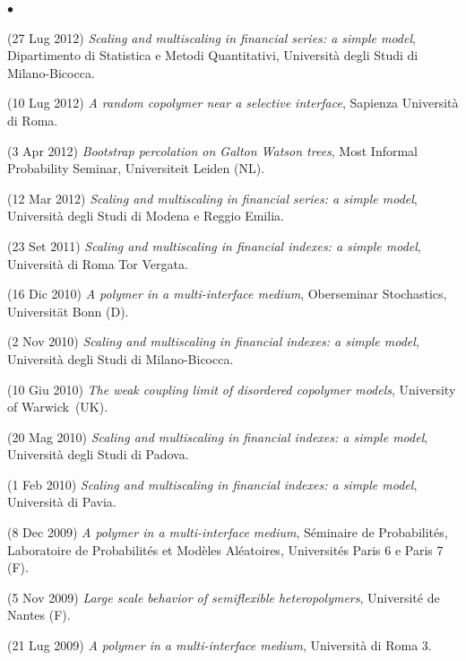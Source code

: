 \documentclass[a4paper,11pt,oneside]{amsart}
\newenvironment{myitemize}{%
\begin{list}{$\bullet$}%
 	{%
	\setlength{\itemsep}{0.3em}%
	\setlength{\topsep}{0.3em}%
	\setlength{\partopsep}{0em}%
	\setlength{\parsep}{0em}%
	\setlength{\parskip}{0em}%
	\setlength\leftmargin{1.5em}%
	\setlength\labelwidth{1.1em}%
	\setlength{\labelsep}{0.4em}%
	}%
	}%
{\end{list}}
\renewenvironment{itemize}{
\begin{myitemize}}%
{\end{myitemize}}
\begin{document}
\begin{itemize}
\item (27 Lug 2012)
\emph{Scaling and multiscaling in financial series: a simple model},
Dipartimento di Statistica e Metodi Quantitativi,
Università degli Studi di Milano-Bicocca.

\item (10 Lug 2012)
\emph{A random copolymer near a selective interface},
Sapienza Università di Roma.

\item (3 Apr 2012)
\emph{Bootstrap percolation on Galton Watson trees},
Most Informal Probability Seminar, Universiteit Leiden (NL).

\item (12 Mar 2012)
\emph{Scaling and multiscaling in financial series: a simple model},
Università degli Studi di Modena e Reggio Emilia.

\item (23 Set 2011)
\emph{Scaling and multiscaling in financial indexes: a simple model},
Università di Roma Tor Vergata.

\item (16 Dic 2010)
\emph{A polymer in a multi-interface medium},
Oberseminar Stochastics,
Universit\"at Bonn (D).

\item (2 Nov 2010)
\emph{Scaling and multiscaling in financial indexes: a simple model},
Università degli Studi di Milano-Bicocca.

\item (10 Giu 2010)
\emph{The weak coupling limit of disordered copolymer models},
University of Warwick~(UK).

\item (20 Mag 2010)
\emph{Scaling and multiscaling in financial indexes: a simple model},
Università degli Studi di Padova.

\item (1 Feb 2010)
\emph{Scaling and multiscaling in financial indexes: a simple model},
Università di Pavia.

\item (8 Dec 2009)
\emph{A polymer in a multi-interface medium},
Séminaire de Probabilités,
Laboratoire de Probabilités et Modèles Aléatoires,
Universités Paris 6 e Paris 7 (F).

\item (5 Nov 2009)
\emph{Large scale behavior of semiflexible heteropolymers},
Université de Nantes (F).

\item (21 Lug 2009)
\textit{A polymer in a multi-interface medium},
Università di Roma 3.


\end{itemize}
\end{document}

